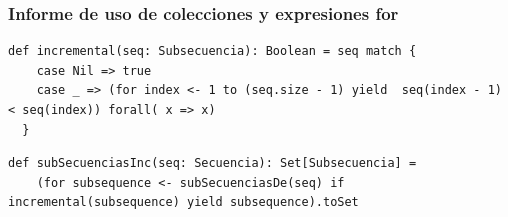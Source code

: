 \documentclass[12pt, a4paper]{article}
\begin{document}
\subsubsection{Informe de uso de colecciones y expresiones for}
\begin{lstlisting}[caption=Código en Scala para la funcion incremental, label=lst:scala_code]
  def incremental(seq: Subsecuencia): Boolean = seq match {
    case Nil => true
    case _ => (for index <- 1 to (seq.size - 1) yield  seq(index - 1) < seq(index)) forall( x => x)
  }
            \end{lstlisting}
  \begin{lstlisting}[caption=Código en Scala para la funcion subSecuenciasInc, label=lst:scala_code]
  def subSecuenciasInc(seq: Secuencia): Set[Subsecuencia] = 
    (for subsequence <- subSecuenciasDe(seq) if incremental(subsequence) yield subsequence).toSet
              \end{lstlisting}
\end{document}
